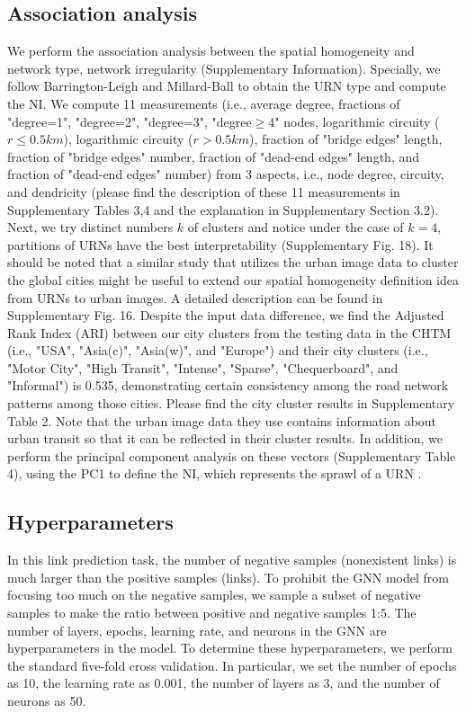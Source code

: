 \documentclass[10pt]{wlscirep}
\begin{document}
\subsection*{Association analysis}
We perform the association analysis between the spatial homogeneity and network type, network irregularity (Supplementary Information). Specially, we follow Barrington-Leigh and Millard-Ball \cite{barrington2019global,barrington2020global} to obtain the URN type and compute the NI. We compute 11 measurements (i.e., average degree, fractions of "degree=1", "degree=2", "degree=3", "degree$\geq$4" nodes, logarithmic circuity ($r\leq 0.5km$), logarithmic circuity ($r>0.5km$), fraction of "bridge edges" length, fraction of "bridge edges" number, fraction of "dead-end edges" length, and fraction of "dead-end edges" number) from 3 aspects, i.e., node degree, circuity, and dendricity (please find the description of these 11 measurements in Supplementary Tables 3,4 and the explanation in Supplementary Section 3.2). Next, we try distinct numbers $k$ of clusters and notice under the case of $k=4$, partitions of URNs have the best interpretability (Supplementary Fig. 18). It should be noted that a similar study that utilizes the urban image data to cluster the global cities \cite{thompson2020global} might be useful to extend our spatial homogeneity definition idea from URNs to urban images. A detailed description can be found in Supplementary Fig. 16. Despite the input data difference, we find the Adjusted Rank Index (ARI) between our city clusters from the testing data in the CHTM (i.e., "USA", "Asia(c)", "Asia(w)", and "Europe") and their city clusters (i.e., "Motor City", "High Transit", "Intense", "Sparse", "Chequerboard", and "Informal") is 0.535, demonstrating certain consistency among the road network patterns among those cities. Please find the city cluster results in Supplementary Table 2. Note that the urban image data they use contains information about urban transit so that it can be reflected in their cluster results. In addition, we perform the principal component analysis on these vectors (Supplementary Table 4), using the PC1 to define the NI, which represents the sprawl of a URN \cite{barrington2020global}. 
\subsection*{Hyperparameters}
In this link prediction task, the number of negative samples (nonexistent links) is much larger than the positive samples (links). To prohibit the GNN model from focusing too much on the negative samples, we sample a subset of negative samples to make the ratio between positive and negative samples 1:5. The number of layers, epochs, learning rate, and neurons in the GNN are hyperparameters in the model. To determine these hyperparameters, we perform the standard five-fold cross validation. In particular, we set the number of epochs as 10, the learning rate as 0.001, the number of layers as 3, and the number of neurons as 50.
\end{document}
